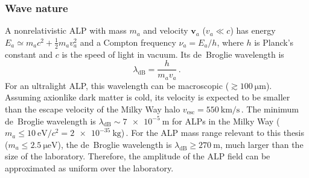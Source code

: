\subsubsection{Wave nature}

A nonrelativistic ALP with mass $m_a$ and velocity $\boldsymbol{v}_a$ ($v_a \ll c$) has energy $E_a \simeq m_a c^2+\tfrac{1}{2}m_a v_a^2$ and a Compton frequency $\nu_a=E_a/h$, where $h$ is Planck's constant and $c$ is the speed of light in vacuum.
Its de~Broglie wavelength is
\begin{equation}
    \lambda_{\mathrm{dB}}=\frac{h}{m_a v_a}
    \,.\label{eq:lambda_dB}
\end{equation}
For an ultralight ALP, this wavelength can be macroscopic ($\gtrsim \SI{100}{\micro\meter}$).
Assuming axionlike dark matter is cold, its velocity is expected to be smaller than the escape velocity of the Milky Way halo $v_\mathrm{esc} = \SI{550}{\km/\s}$\,\cite{Evans2019_SHMRefined}.
The minimum de~Broglie wavelength is $\lambda_{\mathrm{dB}} \sim \SI{7e-5}{\meter}$ for ALPs in the Milky Way ($m_a \leq \SI{10}{\eV/c^2} = \SI{2e-35}{\kilogram}$)\,\cite{Zhang2026_Dissertation_ipynb_1_introduction}.
For the ALP mass range relevant to this thesis ($m_a \leq \SI{2.5}{\micro\electronvolt}$), the de~Broglie wavelength is $\lambda_{\mathrm{dB}} \geq \SI{270}{\meter}$, much larger than the size of the laboratory.
Therefore, the amplitude of the ALP field can be approximated as uniform over the laboratory.


